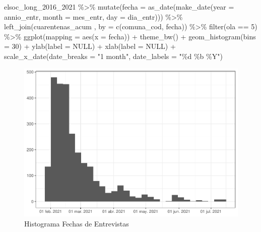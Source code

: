 \documentclass[
  12pt,
]{book}
\newenvironment{Shaded}{\begin{snugshade}}{\end{snugshade}}
\newcommand{\AttributeTok}[1]{\textcolor[rgb]{0.77,0.63,0.00}{#1}}
\newcommand{\ConstantTok}[1]{\textcolor[rgb]{0.00,0.00,0.00}{#1}}
\newcommand{\DecValTok}[1]{\textcolor[rgb]{0.00,0.00,0.81}{#1}}
\newcommand{\FunctionTok}[1]{\textcolor[rgb]{0.00,0.00,0.00}{#1}}
\newcommand{\NormalTok}[1]{#1}
\newcommand{\SpecialCharTok}[1]{\textcolor[rgb]{0.00,0.00,0.00}{#1}}
\newcommand{\StringTok}[1]{\textcolor[rgb]{0.31,0.60,0.02}{#1}}
\begin{document}
\begin{Shaded}
\begin{Highlighting}[]
\NormalTok{elsoc\_long\_2016\_2021 }\SpecialCharTok{\%\textgreater{}\%} 
  \FunctionTok{mutate}\NormalTok{(}\AttributeTok{fecha =} \FunctionTok{as\_date}\NormalTok{(}\FunctionTok{make\_date}\NormalTok{(}\AttributeTok{year =}\NormalTok{ annio\_entr, }\AttributeTok{month =}\NormalTok{ mes\_entr, }\AttributeTok{day =}\NormalTok{ dia\_entr))) }\SpecialCharTok{\%\textgreater{}\%} 
  \FunctionTok{left\_join}\NormalTok{(cuarentenas\_acum , }\AttributeTok{by =} \FunctionTok{c}\NormalTok{(}\StringTok{\textquotesingle{}comuna\_cod\textquotesingle{}}\NormalTok{, }\StringTok{\textquotesingle{}fecha\textquotesingle{}}\NormalTok{)) }\SpecialCharTok{\%\textgreater{}\%} 
  \FunctionTok{filter}\NormalTok{(ola }\SpecialCharTok{==} \DecValTok{5}\NormalTok{) }\SpecialCharTok{\%\textgreater{}\%} 
  \FunctionTok{ggplot}\NormalTok{(}\AttributeTok{mapping =} \FunctionTok{aes}\NormalTok{(}\AttributeTok{x =}\NormalTok{ fecha)) }\SpecialCharTok{+}
  \FunctionTok{theme\_bw}\NormalTok{() }\SpecialCharTok{+} 
  \FunctionTok{geom\_histogram}\NormalTok{(}\AttributeTok{bins =} \DecValTok{30}\NormalTok{) }\SpecialCharTok{+}
  \FunctionTok{ylab}\NormalTok{(}\AttributeTok{label =} \ConstantTok{NULL}\NormalTok{) }\SpecialCharTok{+}
  \FunctionTok{xlab}\NormalTok{(}\AttributeTok{label =} \ConstantTok{NULL}\NormalTok{) }\SpecialCharTok{+}
  \FunctionTok{scale\_x\_date}\NormalTok{(}\AttributeTok{date\_breaks =} \StringTok{"1 month"}\NormalTok{, }\AttributeTok{date\_labels =} \StringTok{"\%d \%b \%Y"}\NormalTok{)}
\end{Highlighting}
\end{Shaded}

\begin{figure}

{\centering \includegraphics{reporte-elsoc_files/figure-latex/hist-fecha-2021-1} 

}

\caption{Histograma Fechas de Entrevistas}\label{fig:hist-fecha-2021}
\end{figure}
\end{document}
